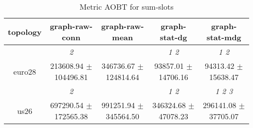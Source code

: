 \begin{table}[h]
\caption{Metric AOBT for sum-slots}

        \centering
        \begin{tabular}{
        ccccc} \toprule 
 topology& graph-raw-conn & graph-raw-mean & graph-stat-dg & graph-stat-mdg \\ \toprule
 & \cellcolor[HTML]{EFEFEF} \textit{ 2 }& \cellcolor[HTML]{EFEFEF} & \cellcolor[HTML]{EFEFEF} \textit{ 1 2 }& \cellcolor[HTML]{EFEFEF} \textit{ 1 2 } \\ 
 {euro28}& \cellcolor[HTML]{EFEFEF} 213608.94 $\pm$ 104496.81& \cellcolor[HTML]{EFEFEF} 346736.67 $\pm$ 124814.64& \cellcolor[HTML]{EFEFEF} 93857.01 $\pm$ 14706.16& \cellcolor[HTML]{EFEFEF} 94313.42 $\pm$ 15638.47 \\ 
& \cellcolor[HTML]{EFEFEF} \textit{ 2 }& \cellcolor[HTML]{EFEFEF} & \cellcolor[HTML]{EFEFEF} \textit{ 1 2 }& \cellcolor[HTML]{EFEFEF} \textit{ 1 2 3 } \\ 
 {us26}& \cellcolor[HTML]{EFEFEF} 697290.54 $\pm$ 172565.38& \cellcolor[HTML]{EFEFEF} 991251.94 $\pm$ 345564.50& \cellcolor[HTML]{EFEFEF} 346324.68 $\pm$ 47078.23& \cellcolor[HTML]{EFEFEF} 296141.08 $\pm$ 37705.07 \\ 

        \bottomrule
        \end{tabular}%

        \end{table}
        
